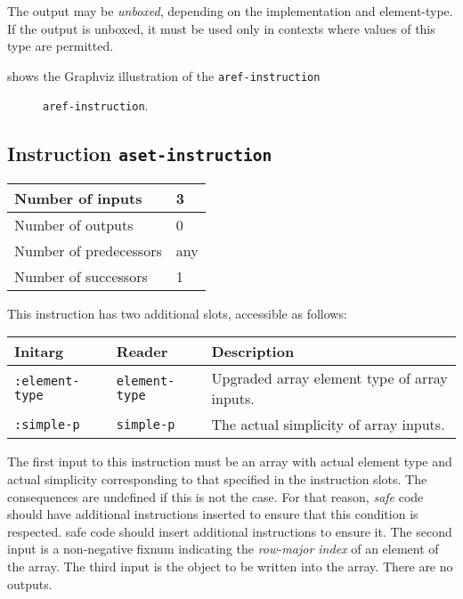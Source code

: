 The output may be \emph{unboxed}, depending on the implementation
and element-type.  If the output is unboxed, it must be used only in
contexts where values of this type are permitted.

 shows the Graphviz illustration of the
\texttt{aref-instruction}

\begin{figure}
\begin{center}
\end{center}
\caption{\label{fig-aref-instruction}
\texttt{aref-instruction}.}
\end{figure}

\subsection{Instruction \texttt{aset-instruction}}
\label{mir-instruction-aset}

\begin{tabular}{|l|l|}
  \hline
  Number of inputs & 3\\
  \hline
  Number of outputs & 0\\
  \hline
  Number of predecessors & any\\
  \hline
  Number of successors & 1\\
  \hline
\end{tabular}

This instruction has two additional slots, accessible as follows:

\begin{tabular}{|l|l|l|}
  \hline
  Initarg & Reader & Description\\
  \hline\hline
  \texttt{:element-type} & \texttt{element-type} & Upgraded array element type of array inputs.\\
  \hline
  \texttt{:simple-p} & \texttt{simple-p} & The actual simplicity of array inputs.\\
  \hline
\end{tabular}

The first input to this instruction must be an array with actual
element type and actual simplicity corresponding to that specified
in the instruction slots. The consequences are undefined if this is
not the case.  For that reason,
\emph{safe} code should have additional instructions inserted to
ensure that this condition is respected.
 safe code should insert additional instructions to
ensure it. The second input is a non-negative fixnum indicating the
\emph{row-major index} of an element of the array. The third input
is the object to be written into the array. There are no outputs.

